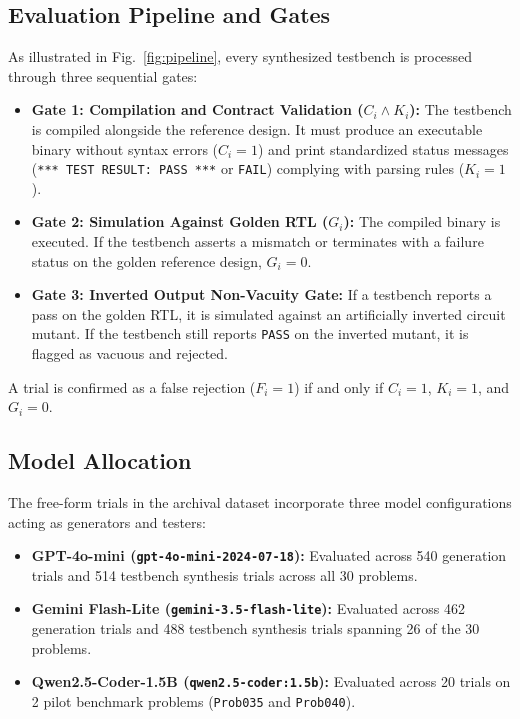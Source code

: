 \documentclass[conference]{IEEEtran}
\begin{document}
\subsection{Evaluation Pipeline and Gates}
As illustrated in Fig.~\ref{fig:pipeline}, every synthesized testbench is processed through three sequential gates:
\begin{itemize}
    \item \textbf{Gate 1: Compilation and Contract Validation ($C_i \land K_i$):} The testbench is compiled alongside the reference design. It must produce an executable binary without syntax errors ($C_i = 1$) and print standardized status messages (\texttt{*** TEST RESULT: PASS ***} or \texttt{FAIL}) complying with parsing rules ($K_i = 1$).
    \item \textbf{Gate 2: Simulation Against Golden RTL ($G_i$):} The compiled binary is executed. If the testbench asserts a mismatch or terminates with a failure status on the golden reference design, $G_i = 0$.
    \item \textbf{Gate 3: Inverted Output Non-Vacuity Gate:} If a testbench reports a pass on the golden RTL, it is simulated against an artificially inverted circuit mutant. If the testbench still reports \texttt{PASS} on the inverted mutant, it is flagged as vacuous and rejected.
\end{itemize}
A trial is confirmed as a false rejection ($F_i = 1$) if and only if $C_i = 1$, $K_i = 1$, and $G_i = 0$.

\subsection{Model Allocation}
The free-form trials in the archival dataset incorporate three model configurations acting as generators and testers:
\begin{itemize}
    \item \textbf{GPT-4o-mini (\texttt{gpt-4o-mini-2024-07-18}):} Evaluated across 540 generation trials and 514 testbench synthesis trials across all 30 problems.
    \item \textbf{Gemini Flash-Lite (\texttt{gemini-3.5-flash-lite}):} Evaluated across 462 generation trials and 488 testbench synthesis trials spanning 26 of the 30 problems.
    \item \textbf{Qwen2.5-Coder-1.5B (\texttt{qwen2.5-coder:1.5b}):} Evaluated across 20 trials on 2 pilot benchmark problems (\texttt{Prob035} and \texttt{Prob040}).
\end{itemize}
\end{document}
